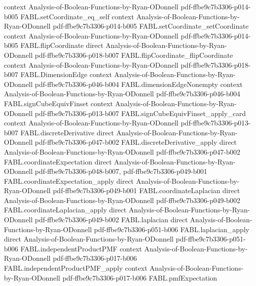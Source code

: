 \begin{theorem}
  {context}
  {Analysis-of-Boolean-Functions-by-Ryan-ODonnell}
  {pdf-ffbe9c7b3306-p014-b005}
\proofstep
  {FABL.setCoordinate_eq_self}
  {context}
  {Analysis-of-Boolean-Functions-by-Ryan-ODonnell}
  {pdf-ffbe9c7b3306-p014-b005}
\proofstep
  {FABL.setCoordinate_setCoordinate}
  {context}
  {Analysis-of-Boolean-Functions-by-Ryan-ODonnell}
  {pdf-ffbe9c7b3306-p014-b005}
\proofstep
  {FABL.flipCoordinate}
  {direct}
  {Analysis-of-Boolean-Functions-by-Ryan-ODonnell}
  {pdf-ffbe9c7b3306-p018-b007}
\proofstep
  {FABL.flipCoordinate_flipCoordinate}
  {context}
  {Analysis-of-Boolean-Functions-by-Ryan-ODonnell}
  {pdf-ffbe9c7b3306-p018-b007}
\proofstep
  {FABL.DimensionEdge}
  {context}
  {Analysis-of-Boolean-Functions-by-Ryan-ODonnell}
  {pdf-ffbe9c7b3306-p046-b004}
\proofstep
  {FABL.dimensionEdgeNonempty}
  {context}
  {Analysis-of-Boolean-Functions-by-Ryan-ODonnell}
  {pdf-ffbe9c7b3306-p046-b004}
\proofstep
  {FABL.signCubeEquivFinset}
  {context}
  {Analysis-of-Boolean-Functions-by-Ryan-ODonnell}
  {pdf-ffbe9c7b3306-p013-b007}
\proofstep
  {FABL.signCubeEquivFinset_apply_card}
  {context}
  {Analysis-of-Boolean-Functions-by-Ryan-ODonnell}
  {pdf-ffbe9c7b3306-p013-b007}
\proofstep
  {FABL.discreteDerivative}
  {direct}
  {Analysis-of-Boolean-Functions-by-Ryan-ODonnell}
  {pdf-ffbe9c7b3306-p047-b002}
\proofstep
  {FABL.discreteDerivative_apply}
  {direct}
  {Analysis-of-Boolean-Functions-by-Ryan-ODonnell}
  {pdf-ffbe9c7b3306-p047-b002}
\proofstep
  {FABL.coordinateExpectation}
  {direct}
  {Analysis-of-Boolean-Functions-by-Ryan-ODonnell}
  {pdf-ffbe9c7b3306-p048-b007,
    pdf-ffbe9c7b3306-p049-b001}
\proofstep
  {FABL.coordinateExpectation_apply}
  {direct}
  {Analysis-of-Boolean-Functions-by-Ryan-ODonnell}
  {pdf-ffbe9c7b3306-p049-b001}
\proofstep
  {FABL.coordinateLaplacian}
  {direct}
  {Analysis-of-Boolean-Functions-by-Ryan-ODonnell}
  {pdf-ffbe9c7b3306-p049-b002}
\proofstep
  {FABL.coordinateLaplacian_apply}
  {direct}
  {Analysis-of-Boolean-Functions-by-Ryan-ODonnell}
  {pdf-ffbe9c7b3306-p049-b002}
\proofstep
  {FABL.laplacian}
  {direct}
  {Analysis-of-Boolean-Functions-by-Ryan-ODonnell}
  {pdf-ffbe9c7b3306-p051-b006}
\proofstep
  {FABL.laplacian_apply}
  {direct}
  {Analysis-of-Boolean-Functions-by-Ryan-ODonnell}
  {pdf-ffbe9c7b3306-p051-b006}
\proofstep
  {FABL.independentProductPMF}
  {context}
  {Analysis-of-Boolean-Functions-by-Ryan-ODonnell}
  {pdf-ffbe9c7b3306-p017-b006}
\proofstep
  {FABL.independentProductPMF_apply}
  {context}
  {Analysis-of-Boolean-Functions-by-Ryan-ODonnell}
  {pdf-ffbe9c7b3306-p017-b006}
\proofstep
  {FABL.pmfExpectation}

\end{theorem}
